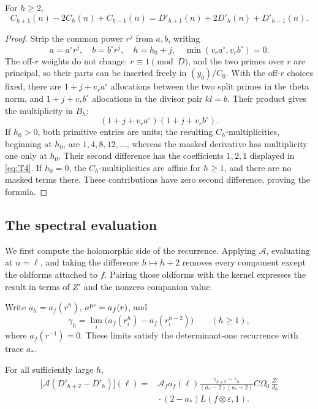 \begin{lemma}\label{tame:mask}
For \(h\ge2\),
\[
 C_{h+1}(n)-2C_h(n)+C_{h-1}(n)
   =D'_{h+1}(n)+2D'_h(n)+D'_{h-1}(n).
 \tag{T4}\label{eq:T4}
\]
\end{lemma}

\begin{proof}
Strip the common power \(r^j\) from \(a,b\), writing
\[
 a=a^\circ r^j,\quad b=b^\circ r^j,\quad h=h_0+j,\quad
 \min(v_ra^\circ,v_rb^\circ)=0.
\]
The off-\(r\) weights do not change: \(r\equiv1\pmod D\), and
the two primes over \(r\) are principal, so their parts can be
inserted freely in \((y_0)/C_0\).
With the off-\(r\) choices fixed, there are
\(1+j+v_ra^\circ\) allocations between the two split primes in
the theta norm, and \(1+j+v_rb^\circ\) allocations in the divisor
pair \(kl=b\). Their product gives the multiplicity in \(B_h\):
\[
 (1+j+v_ra^\circ)(1+j+v_rb^\circ).
\]
If \(h_0>0\), both primitive entries are units; the resulting
\(C_h\)-multiplicities, beginning at \(h_0\), are
\(1,4,8,12,\ldots\), whereas the masked derivative has multiplicity
one only at \(h_0\). Their second difference has the coefficients
\(1,2,1\) displayed in \eqref{eq:T4}. If \(h_0=0\), the
\(C_h\)-multiplicities are affine for \(h\ge1\), and there are
no masked terms there. These contributions have zero second
difference, proving the formula.
\end{proof}

\subsection{The spectral evaluation}

We first compute the holomorphic side of the recurrence. Applying
\(\mathcal A\), evaluating at \(n=\ell\), and taking the difference
\(h\mapsto h+2\) removes every component except the oldforms attached
to \(f\). Pairing those oldforms with the kernel expresses the
result in terms of \(Z'\) and the nonzero companion value.

Write \(a_h=a_f(r^h)\), \(a^{\rm pr}=a_f(r)\), and
\[
 \gamma_h=\lim_i\big(a_f(r_i^h)-a_f(r_i^{h-2})\big)
 \qquad(h\ge1),
\]
where \(a_f(r^{-1})=0\). These limits satisfy the determinant-one
recurrence with trace \(a_*\).

\begin{lemma}\label{tame:spectral-coefficient}
For all sufficiently large \(h\),
\[
 \begin{split}
 \big[\mathcal A(D'_{h+2}-D'_h)\big](\ell)
   ={}&\mathcal A_fa_f(\ell)
      \frac{\gamma_{h+2}-\gamma_h}{(a_*-2)(a_*+2)}
      C\Omega_0\,\frac{Z'}{d_0}\\
     &{}\cdot(2-a_*)L(f\otimes\varepsilon,1).
 \end{split}
 \tag{T5}\label{eq:T5}
\]
\end{lemma}

